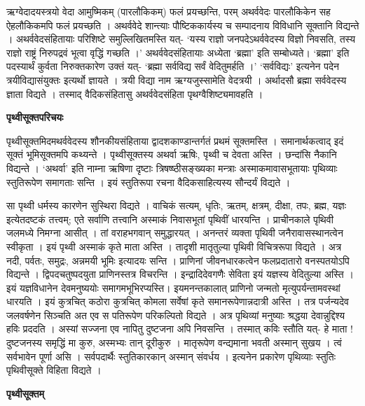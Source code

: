 \documentclass[11pt, a5paper]{article}
\begin{document}
ऋग्वेदादयस्त्रयो वेदा आमुष्मिकम् (पारलौकिकम्) फलं प्रयच्छन्ति, परम् अथर्ववेदः पारलौकिकेन सह  ऐहलौकिकमपि फलं प्रयच्छति । अथर्ववेदे शान्त्याः पौष्टिककार्यस्य च सम्पादनाय विविधानि सूक्तानि विद्यन्ते । अथर्ववेदसंहितायाः परिशिष्टे समुल्लिखितमस्ति यत्- ‘यस्य राज्ञो जनपदेऽथर्ववेदस्य विज्ञो निवसति, तस्य राज्ञो राष्ट्रं निरुपद्रवं भूत्वा वृद्धिं गच्छति ।’ अथर्ववेदसंहितायाः अध्येता ‘ब्रह्मा’ इति सम्बोध्यते। ‘ब्रह्मा’ इति पदस्यार्थं कुर्वता निरुक्तकारेण  उक्तं यत्- ‘ब्रह्मा सर्वविद्य सर्वं वेदितुमर्हति ।’ ‘सर्वविद्यः’ इत्यनेन पदेन त्रयीविद्यासंयुक्तः इत्यर्थो ज्ञायते । त्रयी विद्या नाम ऋग्यजुस्सामेति वेदत्रयी । अर्थादसौ ब्रह्मा सर्ववेदस्य ज्ञाता विद्यते । तस्माद् वैदिकसंहितासु अथर्ववेदसंहिता पृथग्वैशिष्ट्यमावहति ।

\textbf{पृथ्वीसूक्तपरिचयः}

पृथ्वीसूक्तमिदमथर्ववेदस्य शौनकीयसंहिताया द्वादशकाण्डान्तर्गतं प्रथमं सूक्तमस्ति । समानार्थकत्वाद् इदं सूक्तं भूमिसूक्तमपि कथ्यन्ते । पृथ्वीसूक्तस्य अथर्वा ऋषिः, पृथ्वी च देवता अस्ति । छन्दांसि नैकानि विद्यन्ते । ‘अथर्वा’ इति नाम्ना ऋषिणा दृष्टाः त्रिषष्ष्ठीसङ्‌ख्यका मन्त्राः अस्माकमावासभूतायाः पृथिव्याः स्तुतिरूपेण समागताः सन्ति । इयं स्तुतिरूपा रचना वैदिकसाहित्यस्य सौन्दर्यं विद्यते ।

सा पृथ्वी धर्मस्य कारणेन सुस्थिरा विद्यते । वाचिकं सत्यम्, धृतिः, ऋतम्, क्षत्रम्, दीक्षा, तपः, ब्रह्म, यज्ञः इत्येतदष्टकं तत्त्वम्; एते सर्वाणि तत्त्वानि अस्माकं निवासभूतां पृथिवीं धारयन्ति । प्राचीनकाले पृथिवी जलमध्ये निमग्ना आसीत् । तां वराहभगवान् समुद्धारयत् । अनन्तरं व्यक्ता पृथिवी जनैरावासस्थानत्वेन स्वीकृता । इयं पृथ्वी अस्माकं कृते माता अस्ति । तादृशी मातृतुल्या पृथिवी विचित्ररूपा विद्यते । अत्र नदी, पर्वतः, समुद्रः, अन्नमयी भूमिः इत्यादयः सन्ति । प्राणिनां जीवनधारकत्वेन फलप्रदातारो वनस्पतयोऽपि विद्यन्ते । द्विपदचतुष्पदयुता प्राणिनस्तत्र विचरन्ति । इन्द्रादिदेवगणैः सेविता इयं यज्ञस्य वेदितुल्या अस्ति । इयं यज्ञविधानेन देवमनुष्ययोः समागमभूभिरप्यस्ति। इयमनन्तकालात् प्राणिनो जन्मतो मृत्युपर्यन्तामवस्थां धारयति । इयं कुत्रचित् कठोरा कुत्रचित् कोमला सर्वेषां कृते समानरूपेणान्नदात्री अस्ति । तत्र पर्जन्यदेव जलवर्षणेन सिञ्चति अत एव स पतिरूपेण परिकल्पितो विद्यते । अत्र पृथिव्यां मनुष्याः श्रद्धया देवान्नुद्दिश्य हविः प्रददति । अस्यां सज्जना एव नापितु दुष्टजना अपि निवसन्ति । तस्मात् कविः स्तौति यत्- हे माता ! दुष्टजनस्य समृद्धिं मा कुरु, अस्मभ्यः तान् दूरीकुरु । मातृरूपेण वन्द्यमाना भवती अस्मान् सुखय । त्वं सर्वभावेन पूर्णा असि । सर्वपदार्थैः स्तुतिकारकान् अस्मान् संवर्धय । इत्यनेन प्रकारेण पृथिव्याः स्तुतिः पृथिवीसूक्ते विहिता विद्यते ।

\textbf{पृथ्वीसूक्तम्}
\end{document}

